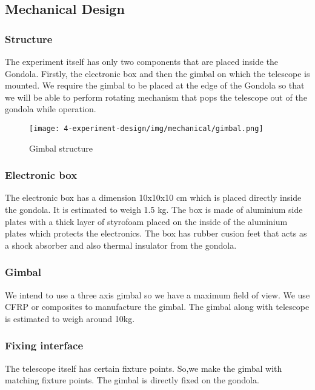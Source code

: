 \newpage
\subsection{Mechanical Design} \label{Mechanical_Design}
\label{sec:mechanical-design}

\subsubsection{Structure}
\label{sec:4.4.1}
The experiment itself has only two components that are placed inside the Gondola. Firstly, the electronic box and then the gimbal on which the telescope is mounted. We require the gimbal to be placed at the edge of the Gondola so that  we will be able to perform rotating mechanism that pops the telescope out of the gondola while operation.

\begin{figure}
    \centering
	\texttt{[image: 4-experiment-design/img/mechanical/gimbal.png]}
	\caption{Gimbal structure}
\end{figure}
\subsubsection{Electronic box}
\label{sec:4.4.2}
The electronic box has a dimension 10x10x10 cm which is placed directly inside the gondola. It is estimated to weigh 1.5 kg. The box is made of aluminium side plates with a thick layer of styrofoam placed on the inside of the aluminium plates which protects the electronics. The box has rubber cusion feet that acts as a shock absorber and also thermal insulator from the gondola.

\subsubsection{Gimbal}
\label {sec:4.4.3}
We intend to use a three axis gimbal so we have a maximum field of view. We use CFRP or composites to manufacture the gimbal. The gimbal along with telescope is estimated to weigh around 10kg.



\subsubsection{Fixing interface}
\label {sec:4.4.5}
The telescope itself has certain fixture points. So,we make the gimbal with matching fixture points. The gimbal is directly fixed on the gondola.